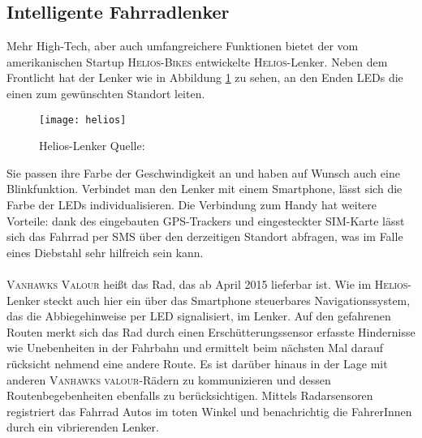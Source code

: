 \subsection{Intelligente Fahrradlenker}
Mehr High-Tech, aber auch umfangreichere Funktionen bietet der vom amerikanischen Startup \textsc{Helios-Bikes} entwickelte \textsc{Helios}-Lenker. Neben dem Frontlicht hat der Lenker wie in Abbildung \ref{fig:helios} zu sehen, an den Enden \glspl{LED} die einen zum gewünschten Standort leiten. 
\begin{figure}[H]
    \centering
    \texttt{[image: helios]}
    \caption[Helios-Lenker]{Helios-Lenker  Quelle: \cite{Helios}} 		
    \label{fig:helios}
\end{figure}
Sie passen ihre Farbe der Geschwindigkeit an und haben auf Wunsch auch eine Blinkfunktion. Verbindet man den Lenker mit einem \gls{Smartphone}, lässt sich die Farbe der \glspl{LED} individualisieren. Die Verbindung zum Handy hat weitere Vorteile: dank des eingebauten \gls{GPS}-Trackers und eingesteckter SIM-Karte lässt sich das Fahrrad per SMS über den derzeitigen Standort abfragen\cite{Helios}, was im Falle eines Diebstahl sehr hilfreich sein kann.\\\\
\textsc{Vanhawks Valour} heißt das Rad, das ab April 2015 lieferbar ist. Wie im \textsc{Helios}-Lenker steckt auch hier ein über das \gls{Smartphone} steuerbares Navigationssystem, das die Abbiegehinweise per \gls{LED} signalisiert, im Lenker. Auf den gefahrenen Routen merkt sich das Rad durch einen Erschütterungssensor erfasste Hindernisse wie Unebenheiten in der Fahrbahn und ermittelt beim nächsten Mal darauf rücksicht nehmend eine andere Route. Es ist darüber hinaus in der Lage mit anderen \textsc{Vanhawks valour}-Rädern zu kommunizieren und dessen Routenbegebenheiten ebenfalls zu berücksichtigen. Mittels Radarsensoren registriert das Fahrrad Autos im toten Winkel und benachrichtig die FahrerInnen durch ein vibrierenden Lenker\cite{vanhawks}.
